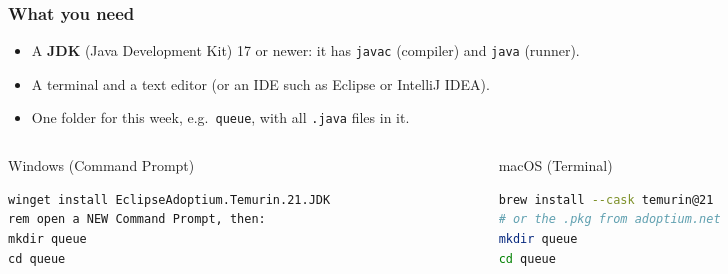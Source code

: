\documentclass[aspectratio=169,10pt,compress]{beamer}
\begin{document}
\begin{frame}[t,fragile] \frametitle{What you need}
  \begin{itemize}
    \item A \textbf{JDK} (Java Development Kit) 17 or newer: it has \texttt{javac} (compiler) and \texttt{java} (runner).
    \item A terminal and a text editor (or an IDE such as Eclipse or IntelliJ IDEA).
    \item One folder for this week, e.g.\ \texttt{queue}, with all \texttt{.java} files in it.
  \end{itemize}
  \begin{columns}[T]
    \begin{column}{0.48\textwidth}
      \begin{block}{Windows (Command Prompt)}


\begin{lstlisting}[style=codesnippet, language={}, basicstyle=\ttfamily\scriptsize]
winget install EclipseAdoptium.Temurin.21.JDK
rem open a NEW Command Prompt, then:
mkdir queue
cd queue
\end{lstlisting}


      \end{block}
    \end{column}
    \begin{column}{0.48\textwidth}
      \begin{block}{macOS (Terminal)}


\begin{lstlisting}[style=codesnippet, language=bash, basicstyle=\ttfamily\scriptsize]
brew install --cask temurin@21
# or the .pkg from adoptium.net
mkdir queue
cd queue
\end{lstlisting}


      \end{block}
    \end{column}
  \end{columns}

\end{frame}

\end{document}
